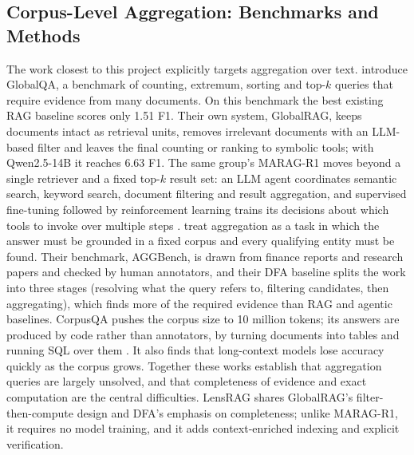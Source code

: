 \documentclass[11pt,letterpaper,oneside]{report}
\begin{document}
\subsection{Corpus-Level Aggregation: Benchmarks and Methods}
The work closest to this project explicitly targets aggregation over text.
\citet{luo2025globalrag} introduce GlobalQA, a benchmark of counting,
extremum, sorting and top-$k$ queries that require evidence from many
documents. On this benchmark the best existing RAG baseline scores only
1.51 F1. Their own system, GlobalRAG, keeps documents intact as retrieval
units, removes irrelevant documents with an LLM-based filter and leaves the
final counting or ranking to symbolic tools; with Qwen2.5-14B it reaches
6.63 F1. The same group's MARAG-R1 moves beyond a
single retriever and a fixed top-$k$ result set: an LLM agent coordinates
semantic search, keyword search, document filtering and result aggregation,
and supervised fine-tuning followed by reinforcement learning trains its
decisions about which tools to invoke over multiple steps
\citep{luo2025maragr1}. \citet{zhu2026aggbench} treat aggregation as a task in which the answer must
be grounded in a fixed corpus and every qualifying entity must be found. Their
benchmark, AGGBench, is drawn from finance reports and research papers and
checked by human annotators, and their DFA baseline splits the work into
three stages (resolving what the query refers to, filtering candidates, then
aggregating), which finds more of the required evidence than RAG and agentic
baselines. CorpusQA pushes the corpus size to 10 million tokens; its answers are
produced by code rather than annotators, by turning documents into tables and
running SQL over them \citep{lu2026corpusqa}. It also finds that long-context
models lose accuracy quickly as the corpus grows. Together
these works establish that aggregation queries are largely unsolved, and that
completeness of evidence and exact computation are the central difficulties.
LensRAG shares GlobalRAG's filter-then-compute design and DFA's emphasis on
completeness; unlike MARAG-R1, it requires no model training, and it adds
context-enriched indexing and explicit verification.
\end{document}
